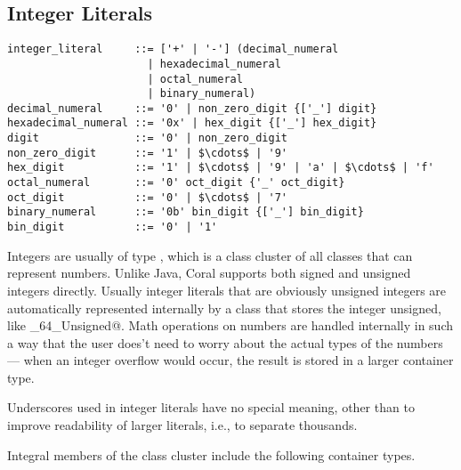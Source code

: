 \subsection{Integer Literals}\label{sec:integerliterals}

\syntax\begin{lstlisting}
integer_literal     ::= ['+' | '-'] (decimal_numeral
	                  | hexadecimal_numeral
	                  | octal_numeral
	                  | binary_numeral)
decimal_numeral     ::= '0' | non_zero_digit {['_'] digit}
hexadecimal_numeral ::= '0x' | hex_digit {['_'] hex_digit}
digit               ::= '0' | non_zero_digit
non_zero_digit      ::= '1' | $\cdots$ | '9'
hex_digit           ::= '1' | $\cdots$ | '9' | 'a' | $\cdots$ | 'f'
octal_numeral       ::= '0' oct_digit {'_' oct_digit}
oct_digit           ::= '0' | $\cdots$ | '7'
binary_numeral      ::= '0b' bin_digit {['_'] bin_digit}
bin_digit           ::= '0' | '1'
\end{lstlisting}
Integers are usually of type \lstinline@Number@, which is a class cluster of all classes that can represent numbers. Unlike Java, Coral supports both signed and unsigned integers directly. Usually integer literals that are obviously unsigned integers are automatically represented internally by a class that stores the integer unsigned, like \lstinline@Integer_64_Unsigned@. Math operations on numbers are handled internally in such a way that the user does't need to worry about the actual types of the numbers — when an integer overflow would occur, the result is stored in a larger container type. 

Underscores used in integer literals have no special meaning, other than to improve readability of larger literals, i.e., to separate thousands.

Integral members of the \lstinline@Number@ class cluster include the following container types. 

